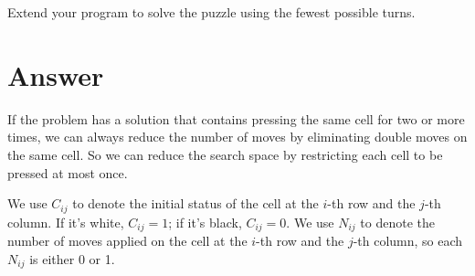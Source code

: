 \documentclass[12pt,letterpaper]{article}
\begin{document}
Extend your program to solve the puzzle using the fewest possible turns.

\part*{Answer}
If the problem has a solution that contains pressing the same cell for two or more times, we can always reduce the number of moves by eliminating double moves on the same cell. So we can reduce the search space by restricting each cell to be pressed at most once.

We use $C_{ij}$ to denote the initial status of the cell at the $i$-th row and the $j$-th column. If it's white, $C_{ij}=1$; if it's black, $C_{ij}=0$. We use $N_{ij}$ to denote the number of moves applied on the cell at the $i$-th row and the $j$-th column, so each $N_{ij}$ is either 0 or 1.
\end{document}
